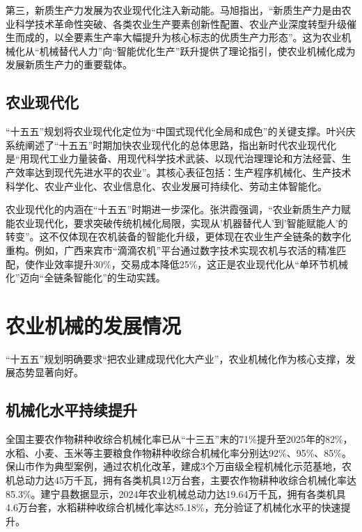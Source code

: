 \documentclass[12pt,fontset=windows]{ctexart}
\begin{document}
第三，新质生产力发展为农业现代化注入新动能。马旭指出，“新质生产力是由农业科学技术革命性突破、各类农业生产要素创新性配置、农业产业深度转型升级催生而成的，以全要素生产率大幅提升为核心标志的优质生产力形态”\cite{MaXuXinZhiShengChanLiQuDongNongYeNongCunXianDaiHuaJiLiZuZhiYuYouHua2025}。这为农业机械化从“机械替代人力”向“智能优化生产”跃升提供了理论指引，使农业机械化成为发展新质生产力的重要载体。

\subsection{农业现代化}

“十五五”规划将农业现代化定位为“中国式现代化全局和成色”的关键支撑。叶兴庆系统阐述了“十五五”时期加快农业现代化的总体思路，指出新时代农业现代化是“用现代工业力量装备、用现代科学技术武装、以现代治理理论和方法经营、生产效率达到现代先进水平的农业”\cite{YeXingQingShenRuLingHuiShiWuWuShiQiJiaKuaiNongYeXianDaiHuaDeZongTiSiLu2025}。其核心表征包括：生产程序机械化、生产技术科学化、农业产业化、农业信息化、农业发展可持续化、劳动主体智能化。

农业现代化的内涵在“十五五”时期进一步深化。张洪霞强调，“农业新质生产力赋能农业现代化，要求突破传统机械化局限，实现从'机器替代人'到'智能赋能人'的转变”\cite{ZhangHongXiaNongYeXinZhiShengChanLiFuNengNongYeXianDaiHuaNeiHanYiYunXianShiKunJingJiShiJianLuJing2025}。这不仅体现在农机装备的智能化升级，更体现在农业生产全链条的数字化重构。例如，广西来宾市“滴滴农机”平台通过数字技术实现农机与农活的精准匹配，使作业效率提升30\%，交易成本降低25\%\cite{MaoMeiYanShuZiJiShuDuiNongYeChanYeLianXianDaiHuaDeKongJianYiChuXiaoYingJiYingXiangJiZhi2025}，这正是农业现代化从“单环节机械化”迈向“全链条智能化”的生动实践。

\section{农业机械的发展情况}

“十五五”规划明确要求“把农业建成现代化大产业”，农业机械化作为核心支撑，发展态势显著向好。

\subsection{机械化水平持续提升}

全国主要农作物耕种收综合机械化率已从“十三五”末的71\%提升至2025年的82\%，水稻、小麦、玉米等主要粮食作物耕种收综合机械化率分别达92\%、95\%、85\%\cite{FuHuaPingShenGengWoYeJiXianXingWoShiYiNongJiHuaGaiGeHuiJiuNongYeZhenXingXinTuJing2025}。保山市作为典型案例，通过农机化改革，建成3个万亩级全程机械化示范基地，农机总动力达45万千瓦，拥有各类机具12万台套，主要农作物耕种收综合机械化率达85.3\%\cite{FuHuaPingShenGengWoYeJiXianXingWoShiYiNongJiHuaGaiGeHuiJiuNongYeZhenXingXinTuJing2025}。建宁县数据显示，2024年农业机械总动力达19.64万千瓦，拥有各类机具4.6万台套，水稻耕种收综合机械化率达85.18\%\cite{FuHuaPingShenGengWoYeJiXianXingWoShiYiNongJiHuaGaiGeHuiJiuNongYeZhenXingXinTuJing2025}，充分验证了机械化水平的快速提升。
\end{document}
